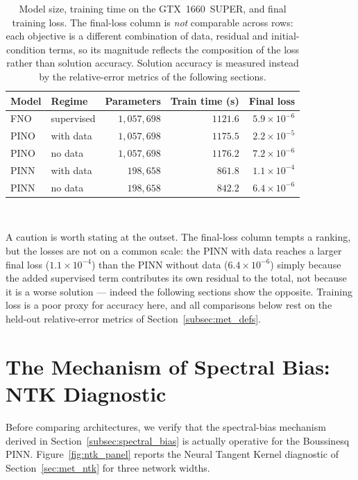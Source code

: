 \begin{table}[htbp]
    \centering
    \caption{Model size, training time on the GTX~1660~SUPER, and final training loss. The final-loss column is \emph{not} comparable across rows: each objective is a different combination of data, residual and initial-condition terms, so its magnitude reflects the composition of the loss rather than solution accuracy. Solution accuracy is measured instead by the relative-error metrics of the following sections.}
    \label{tab:training}
    \small
    \begin{tabular}{llrrr}
        \hline
        \textbf{Model} & \textbf{Regime} & \textbf{Parameters} & \textbf{Train time (s)} & \textbf{Final loss} \\
        \hline
        FNO  & supervised   & $1{,}057{,}698$ & $1121.6$ & $5.9 \times 10^{-6}$ \\
        PINO & with data    & $1{,}057{,}698$ & $1175.5$ & $2.2 \times 10^{-5}$ \\
        PINO & no data      & $1{,}057{,}698$ & $1176.2$ & $7.2 \times 10^{-6}$ \\
        PINN & with data    & $198{,}658$     & $861.8$  & $1.1 \times 10^{-4}$ \\
        PINN & no data      & $198{,}658$     & $842.2$  & $6.4 \times 10^{-6}$ \\
        \hline
    \end{tabular}
    \\[0.4em]
    \autoriapropria
\end{table}

A caution is worth stating at the outset. The final-loss column tempts a ranking, but the losses are not on a common scale: the PINN with data reaches a larger final loss ($1.1 \times 10^{-4}$) than the PINN without data ($6.4 \times 10^{-6}$) simply because the added supervised term contributes its own residual to the total, not because it is a worse solution --- indeed the following sections show the opposite. Training loss is a poor proxy for accuracy here, and all comparisons below rest on the held-out relative-error metrics of Section~\ref{subsec:met_defs}.

\section{The Mechanism of Spectral Bias: NTK Diagnostic}
\label{sec:res_ntk}

Before comparing architectures, we verify that the spectral-bias mechanism derived in Section~\ref{subsec:spectral_bias} is actually operative for the Boussinesq PINN. Figure~\ref{fig:ntk_panel} reports the Neural Tangent Kernel diagnostic of Section~\ref{sec:met_ntk} for three network widths.

